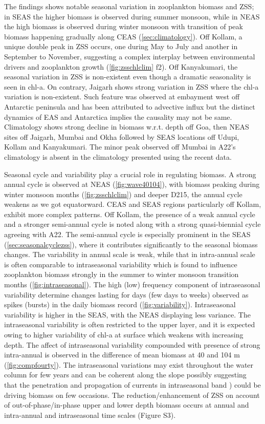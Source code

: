 \documentclass[authoryear,review,12pt]{elsarticle}
\begin{document}
	The findings shows notable seasonal variation in zooplankton biomass and ZSS; in SEAS the higher biomass is observed during summer monsoon, while in NEAS the high biomass is observed during winter monsoon with transition of peak biomass happening gradually along CEAS (\cref{sec:climatology}). Off Kollam, a unique double peak in ZSS occurs, one during May to July and another in September to November, suggesting a complex interplay between environmental drivers and zooplankton growth (\cref{fig:zsschlclim} f2). Off Kanyakumari, the seasonal variation in ZSS is non-existent even though a dramatic seasonality is seen in chl-a. On contrary, Jaigarh shows strong variation in ZSS where the chl-a variation is non-existent. Such feature was observed at embayment west off Antarctic peninsula and has been attributed to advective influx \citep{espinasse2012austral} but the distinct dynamics of EAS and Antarctica implies the causality may not be same. Climatology shows strong decline in biomass w.r.t. depth off Goa, then NEAS sites off Jaigarh, Mumbai and Okha followed by SEAS locations off Udupi, Kollam and Kanyakumari. The minor peak observed off Mumbai in A22's climatology is absent in the climatology presented using the recent data.
	

	Seasonal cycle and variability play a crucial role in regulating biomass. A strong annual cycle is observed at NEAS (\cref{fig:wave40104}), with biomass peaking during winter monsoon months (\cref{fig:zsschlclim}) and deeper D215, the annual cycle weakens as we got equatorward. CEAS and SEAS regions particularly off Kollam, exhibit more complex patterns. Off Kollam, the presence of a weak annual cycle and a stronger semi-annual cycle is noted along with a strong quasi-biennial cycle agreeing with A22. The semi-annual cycle is especially prominent in the SEAS (\cref{sec:seasonalcyclezss}), where it contributes significantly to the seasonal biomass changes. The variability in annual scale is weak, while that in intra-annual scale is often comparable to intraseasonal variability which is found to influence zooplankton biomass strongly in the summer to winter monsoon transition months (\cref{fig:intraseasonal}). The high (low) frequency component of intraseasonal variability determine changes lasting for days (few days to weeks) observed as spikes (bursts) in the daily biomass record (\cref{fig:variability}). Intraseasonal variability is higher in the SEAS, with the NEAS displaying less variance. The intraseasonal variability is often restricted to the upper layer, and it is expected owing to higher variability of chl-a at surface which weakens with increasing depth. The affect of intraseasonal variability compounded with presence of strong intra-annual is observed in the difference of mean biomass at 40 and 104 m (\cref{fig:compfourty}). The intraseasonal variations may exist throughout the water column for few years and can be coherent along the slope possibly suggesting that the penetration and propagation of currents in intraseasonal band \citep{amol2012observational,amol2014observed,chaudhuri2020observed}) could be driving biomass on few occasions. The reduction/enhancement of ZSS on account of out-of-phase/in-phase upper and lower depth biomass occurs at annual and intra-annual and intraseasonal time scales (Figure S3).  
	
\end{document}
